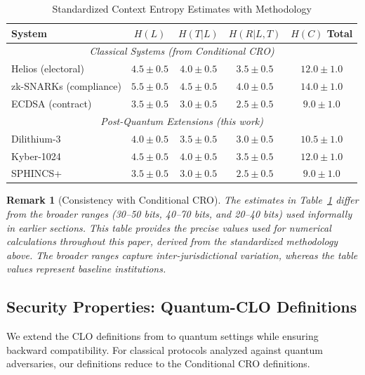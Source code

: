 \documentclass{ieeeaccess}
\newtheorem{remark}{Remark}[section]
\begin{document}
\begin{table}[t]
\centering
\caption{Standardized Context Entropy Estimates with Methodology}
\label{tab:h_c_uniform}
\small
\setlength{\tabcolsep}{3pt}
\begin{tabular}{lcccc}
\toprule
\textbf{System} & $H(L)$ & $H(T|L)$ & $H(R|L,T)$ & $H(C)$ \textbf{Total} \\
\midrule
\multicolumn{5}{c}{\textit{Classical Systems (from Conditional CRO)}} \\
\midrule
Helios (electoral)     & $4.5 \pm 0.5$ & $4.0 \pm 0.5$ & $3.5 \pm 0.5$ & $\mathbf{12.0 \pm 1.0}$ \\
zk-SNARKs (compliance) & $5.5 \pm 0.5$ & $4.5 \pm 0.5$ & $4.0 \pm 0.5$ & $\mathbf{14.0 \pm 1.0}$ \\
ECDSA (contract)       & $3.5 \pm 0.5$ & $3.0 \pm 0.5$ & $2.5 \pm 0.5$ & $\mathbf{9.0 \pm 1.0}$  \\
\midrule
\multicolumn{5}{c}{\textit{Post-Quantum Extensions (this work)}} \\
\midrule
Dilithium-3 & $4.0 \pm 0.5$ & $3.5 \pm 0.5$ & $3.0 \pm 0.5$ & $\mathbf{10.5 \pm 1.0}$ \\
Kyber-1024  & $4.5 \pm 0.5$ & $4.0 \pm 0.5$ & $3.5 \pm 0.5$ & $\mathbf{12.0 \pm 1.0}$ \\
SPHINCS+    & $3.5 \pm 0.5$ & $3.0 \pm 0.5$ & $2.5 \pm 0.5$ & $\mathbf{9.0 \pm 1.0}$  \\
\bottomrule
\end{tabular}
\end{table}

\begin{remark}[Consistency with Conditional CRO]
The estimates in Table~\ref{tab:h_c_uniform} differ from the broader ranges (30--50 bits, 40--70 bits, and 20--40 bits) used informally in earlier sections. This table provides the precise values used for numerical calculations throughout this paper, derived from the standardized methodology above. The broader ranges capture inter-jurisdictional variation, whereas the table values represent baseline institutions.
\end{remark}

\subsection{Security Properties: Quantum-CLO Definitions}

We extend the CLO definitions from \cite[Section III-B]{Minka2026CRO} to quantum settings while ensuring backward compatibility. For classical protocols analyzed against quantum adversaries, our definitions reduce to the Conditional CRO definitions.
\end{document}
